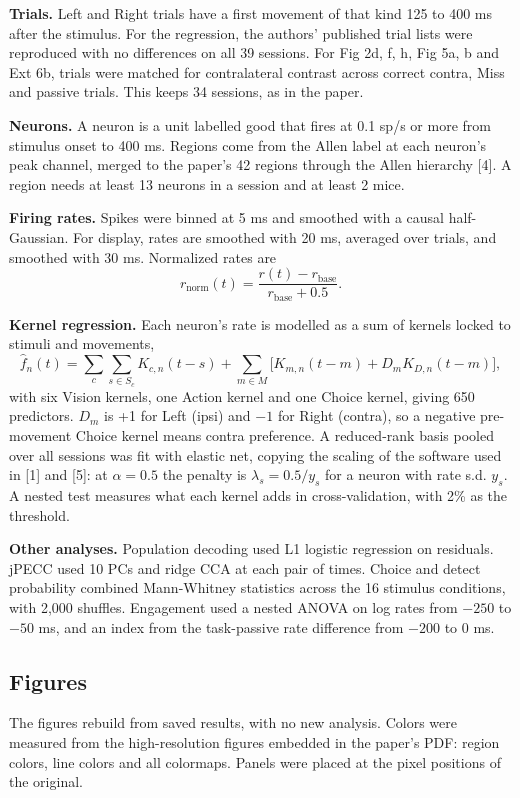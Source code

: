 \documentclass[11pt,a4paper]{article}
\begin{document}
\textbf{Trials.} Left and Right trials have a first movement of that kind 125 to 400 ms after the stimulus. For the regression, the authors' published trial lists were reproduced with no differences on all 39 sessions. For Fig 2d, f, h, Fig 5a, b and Ext 6b, trials were matched for contralateral contrast across correct contra, Miss and passive trials. This keeps 34 sessions, as in the paper.

\textbf{Neurons.} A neuron is a unit labelled good that fires at 0.1 sp/s or more from stimulus onset to 400 ms. Regions come from the Allen label at each neuron's peak channel, merged to the paper's 42 regions through the Allen hierarchy [4]. A region needs at least 13 neurons in a session and at least 2 mice.

\textbf{Firing rates.} Spikes were binned at 5 ms and smoothed with a causal half-Gaussian. For display, rates are smoothed with 20 ms, averaged over trials, and smoothed with 30 ms. Normalized rates are
\begin{equation}
r_{\text{norm}}(t) = \frac{r(t) - r_{\text{base}}}{r_{\text{base}} + 0.5}.
\end{equation}

\textbf{Kernel regression.} Each neuron's rate is modelled as a sum of kernels locked to stimuli and movements,
\begin{equation}
\hat f_n(t) = \sum_c \sum_{s \in S_c} K_{c,n}(t - s) + \sum_{m \in M} \big[ K_{m,n}(t - m) + D_m K_{D,n}(t - m) \big],
\end{equation}
with six Vision kernels, one Action kernel and one Choice kernel, giving 650 predictors. $D_m$ is +1 for Left (ipsi) and $-1$ for Right (contra), so a negative pre-movement Choice kernel means contra preference. A reduced-rank basis pooled over all sessions was fit with elastic net, copying the scaling of the software used in [1] and [5]: at $\alpha = 0.5$ the penalty is $\lambda_s = 0.5 / y_s$ for a neuron with rate s.d. $y_s$. A nested test measures what each kernel adds in cross-validation, with 2\% as the threshold.

\textbf{Other analyses.} Population decoding used L1 logistic regression on residuals. jPECC used 10 PCs and ridge CCA at each pair of times. Choice and detect probability combined Mann-Whitney statistics across the 16 stimulus conditions, with 2,000 shuffles. Engagement used a nested ANOVA on log rates from $-250$ to $-50$ ms, and an index from the task-passive rate difference from $-200$ to 0 ms.

\subsection{Figures}
The figures rebuild from saved results, with no new analysis. Colors were measured from the high-resolution figures embedded in the paper's PDF: region colors, line colors and all colormaps. Panels were placed at the pixel positions of the original.
\end{document}
